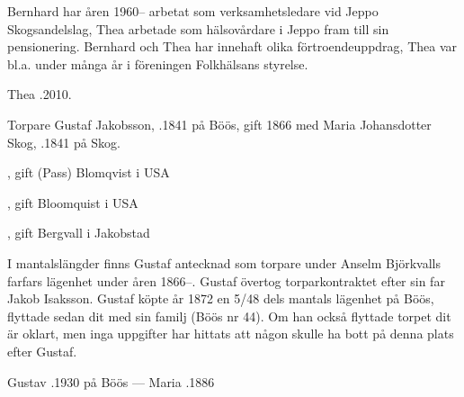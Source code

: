 Bernhard har åren 1960-- arbetat som verksamhetsledare vid Jeppo Skogsandelslag, Thea arbetade som hälsovårdare i Jeppo fram	till sin pensionering. Bernhard och Thea har innehaft olika förtroendeuppdrag, Thea var bl.a. under många år i föreningen Folkhälsans styrelse.

Thea .2010.





Torpare Gustaf Jakobsson, .1841 på Böös, gift 1866 med Maria Johansdotter Skog, .1841 på Skog.
\begin{jhchildren}
  \item {}
  \item {}, gift (Pass) Blomqvist i USA
  \item {}
  \item {}
  \item {}, gift Bloomquist i USA
  \item {}
  \item {}
  \item {}, gift Bergvall i Jakobstad
\end{jhchildren}

I mantalslängder finns Gustaf antecknad som torpare under Anselm Björkvalls farfars lägenhet under åren 1866--. Gustaf övertog torparkontraktet efter sin far Jakob Isaksson. Gustaf köpte år 1872 en 5/48 dels mantals lägenhet på Böös, flyttade sedan dit med sin familj (Böös nr 44). Om han också flyttade torpet dit är oklart, men inga uppgifter har hittats att någon skulle ha bott på denna plats efter Gustaf.

Gustav .1930 på Böös  ---  Maria .1886


